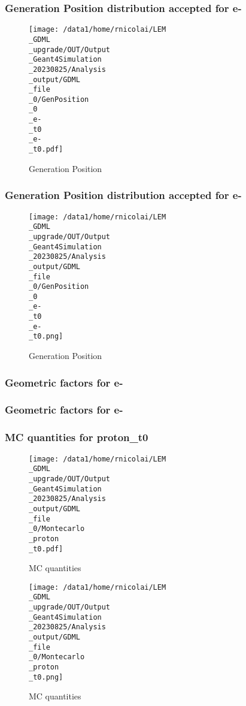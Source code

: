 \documentclass[8pt]{beamer}
\begin{document}
            \begin{frame}
                \frametitle{Generation Position distribution accepted for e-}
            
        \begin{figure}[h]
            \centering
            \texttt{[image: /data1/home/rnicolai/LEM\\\_GDML\\\_upgrade/OUT/Output\\\_Geant4Simulation\\\_20230825/Analysis\\\_output/GDML\\\_file\\\_0/GenPosition\\\_0\\\_e-\\\_t0\\\_e-\\\_t0.pdf]}
            \caption{Generation Position}
        \end{figure}
        
            \end{frame}
            
            \begin{frame}
                \frametitle{Generation Position distribution accepted for e-}
            
        \begin{figure}[h]
            \centering
            \texttt{[image: /data1/home/rnicolai/LEM\\\_GDML\\\_upgrade/OUT/Output\\\_Geant4Simulation\\\_20230825/Analysis\\\_output/GDML\\\_file\\\_0/GenPosition\\\_0\\\_e-\\\_t0\\\_e-\\\_t0.png]}
            \caption{Generation Position}
        \end{figure}
        
            \end{frame}
            
            \begin{frame}
                \frametitle{Geometric factors for e-}
            
            \end{frame}
            
            \begin{frame}
                \frametitle{Geometric factors for e-}
            
            \end{frame}
            
            \begin{frame}
                \frametitle{MC quantities for proton\_t0}
            
        \begin{figure}[h]
            \centering
            \texttt{[image: /data1/home/rnicolai/LEM\\\_GDML\\\_upgrade/OUT/Output\\\_Geant4Simulation\\\_20230825/Analysis\\\_output/GDML\\\_file\\\_0/Montecarlo\\\_proton\\\_t0.pdf]}
            \caption{MC quantities}
        \end{figure}
        
        \begin{figure}[h]
            \centering
            \texttt{[image: /data1/home/rnicolai/LEM\\\_GDML\\\_upgrade/OUT/Output\\\_Geant4Simulation\\\_20230825/Analysis\\\_output/GDML\\\_file\\\_0/Montecarlo\\\_proton\\\_t0.png]}
            \caption{MC quantities}
        \end{figure}
        
            \end{frame}
            
\end{document}
